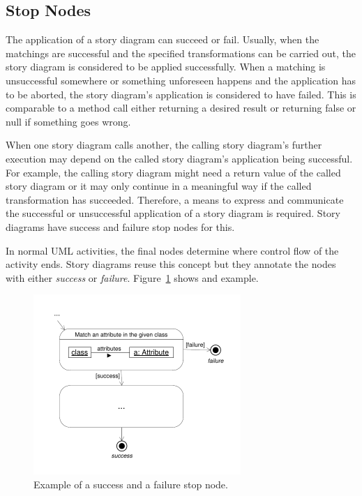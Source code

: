 \subsection{Stop Nodes} \label{sec:StopNodes}

The application of a story diagram can succeed or fail.
Usually, when the matchings are successful and the specified transformations can be carried out, the story diagram is considered to be applied successfully.
When a matching is unsuccessful somewhere or something unforeseen happens and the application has to be aborted, the story diagram's application is considered to have failed.
This is comparable to a method call either returning a desired result or returning false or null if something goes wrong.

When one story diagram calls another, the calling story diagram's further execution may depend on the called story diagram's application being successful.
For example, the calling story diagram might need a return value of the called story diagram or it may only continue in a meaningful way if the called transformation has succeeded.
Therefore, a means to express and communicate the successful or unsuccessful application of a story diagram is required.
Story diagrams have success and failure stop nodes for this.

In normal UML activities, the final nodes determine where control flow of the activity ends.
Story diagrams reuse this concept but they annotate the nodes with either \emph{success} or \emph{failure}.
Figure~\ref{fig:successAndFailureStopNodes} shows and example.

\begin{figure}[htb]
\begin{center}
  \includegraphics[width=0.7\textwidth]{figures/SuccessAndFailureStopNodes}
  \caption{Example of a success and a failure stop node.}
  \label{fig:successAndFailureStopNodes}
\end{center}
\end{figure}

